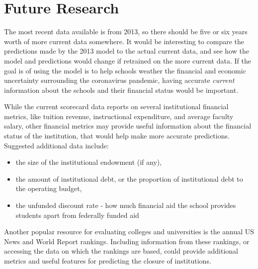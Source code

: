 \documentclass[11pt, letterpaper]{article}
\begin{document}
\section{Future Research}

The most recent data available is from 2013, so there should be five or six years worth of more current data somewhere. It would be interesting to compare the predictions made by the 2013 model to the actual current data, and see how the model and predictions would change if retrained on the more current data. If the goal is of using the model is to help schools weather the financial and economic uncertainty surrounding the coronavirus pandemic, having accurate \textit{current} information about the schools and their financial status would be important.

While the current scorecard data reports on several institutional financial metrics, like tuition revenue, instructional expenditure, and average faculty salary, other financial metrics may provide useful information about the financial status of the institution, that would help make more accurate predictions. Suggested additional data include:
\begin{itemize}
\item the size of the institutional endowment (if any),
\item the amount of institutional debt, or the proportion of institutional debt to the operating budget,
\item the unfunded discount rate - how much financial aid the school provides students apart from federally funded aid
\end{itemize}

Another popular resource for evaluating colleges and universities is the annual US News and World Report rankings. Including information from these rankings, or accessing the data on which the rankings are based, could provide additional metrics and useful features for predicting the closure of institutions.
\end{document}
